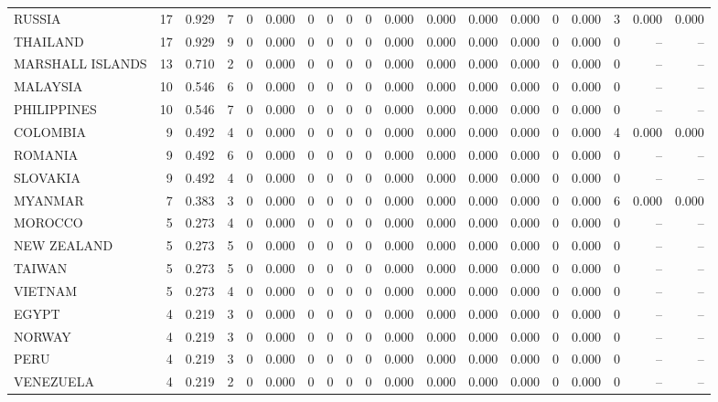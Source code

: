 \begin{tabular}{lrrrrrrrrrrrrrrrrrr}
RUSSIA & 17 & 0.929 & 7 & 0 & 0.000 & 0 & 0 & 0 & 0 & 0.000 & 0.000 & 0.000 & 0.000 & 0 & 0.000 & 3 & 0.000 & 0.000 \\
THAILAND & 17 & 0.929 & 9 & 0 & 0.000 & 0 & 0 & 0 & 0 & 0.000 & 0.000 & 0.000 & 0.000 & 0 & 0.000 & 0 & -- & -- \\
MARSHALL ISLANDS & 13 & 0.710 & 2 & 0 & 0.000 & 0 & 0 & 0 & 0 & 0.000 & 0.000 & 0.000 & 0.000 & 0 & 0.000 & 0 & -- & -- \\
MALAYSIA & 10 & 0.546 & 6 & 0 & 0.000 & 0 & 0 & 0 & 0 & 0.000 & 0.000 & 0.000 & 0.000 & 0 & 0.000 & 0 & -- & -- \\
PHILIPPINES & 10 & 0.546 & 7 & 0 & 0.000 & 0 & 0 & 0 & 0 & 0.000 & 0.000 & 0.000 & 0.000 & 0 & 0.000 & 0 & -- & -- \\
COLOMBIA & 9 & 0.492 & 4 & 0 & 0.000 & 0 & 0 & 0 & 0 & 0.000 & 0.000 & 0.000 & 0.000 & 0 & 0.000 & 4 & 0.000 & 0.000 \\
ROMANIA & 9 & 0.492 & 6 & 0 & 0.000 & 0 & 0 & 0 & 0 & 0.000 & 0.000 & 0.000 & 0.000 & 0 & 0.000 & 0 & -- & -- \\
SLOVAKIA & 9 & 0.492 & 4 & 0 & 0.000 & 0 & 0 & 0 & 0 & 0.000 & 0.000 & 0.000 & 0.000 & 0 & 0.000 & 0 & -- & -- \\
MYANMAR & 7 & 0.383 & 3 & 0 & 0.000 & 0 & 0 & 0 & 0 & 0.000 & 0.000 & 0.000 & 0.000 & 0 & 0.000 & 6 & 0.000 & 0.000 \\
MOROCCO & 5 & 0.273 & 4 & 0 & 0.000 & 0 & 0 & 0 & 0 & 0.000 & 0.000 & 0.000 & 0.000 & 0 & 0.000 & 0 & -- & -- \\
NEW ZEALAND & 5 & 0.273 & 5 & 0 & 0.000 & 0 & 0 & 0 & 0 & 0.000 & 0.000 & 0.000 & 0.000 & 0 & 0.000 & 0 & -- & -- \\
TAIWAN & 5 & 0.273 & 5 & 0 & 0.000 & 0 & 0 & 0 & 0 & 0.000 & 0.000 & 0.000 & 0.000 & 0 & 0.000 & 0 & -- & -- \\
VIETNAM & 5 & 0.273 & 4 & 0 & 0.000 & 0 & 0 & 0 & 0 & 0.000 & 0.000 & 0.000 & 0.000 & 0 & 0.000 & 0 & -- & -- \\
EGYPT & 4 & 0.219 & 3 & 0 & 0.000 & 0 & 0 & 0 & 0 & 0.000 & 0.000 & 0.000 & 0.000 & 0 & 0.000 & 0 & -- & -- \\
NORWAY & 4 & 0.219 & 3 & 0 & 0.000 & 0 & 0 & 0 & 0 & 0.000 & 0.000 & 0.000 & 0.000 & 0 & 0.000 & 0 & -- & -- \\
PERU & 4 & 0.219 & 3 & 0 & 0.000 & 0 & 0 & 0 & 0 & 0.000 & 0.000 & 0.000 & 0.000 & 0 & 0.000 & 0 & -- & -- \\
VENEZUELA & 4 & 0.219 & 2 & 0 & 0.000 & 0 & 0 & 0 & 0 & 0.000 & 0.000 & 0.000 & 0.000 & 0 & 0.000 & 0 & -- & -- \\

\end{tabular}
